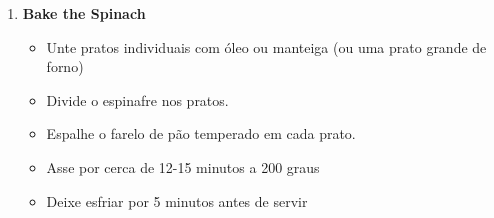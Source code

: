 \documentclass [11pt, letterpaper] {article}
\begin{document}
\begin {description}
\begin {enumerate}
\item {\bf Bake the Spinach}
\begin {itemize}
\item Unte pratos individuais com óleo ou manteiga (ou uma prato grande de forno)
\item Divide o espinafre nos pratos.
\item Espalhe o farelo de pão temperado em cada prato.
\item Asse por cerca de 12-15 minutos a 200 graus
\item Deixe esfriar por 5 minutos antes de servir
\end {itemize}
\end {enumerate}
\end {description}
\end{document}
